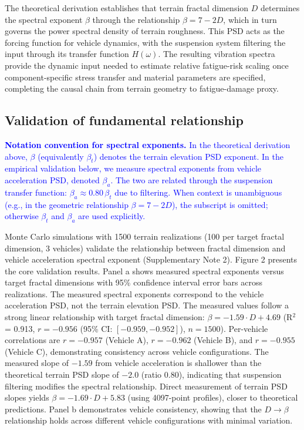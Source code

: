 \documentclass[11pt]{article}
\begin{document}
The theoretical derivation establishes that terrain fractal dimension $D$ determines the spectral exponent $\beta$ through the relationship $\beta = 7-2D$, which in turn governs the power spectral density of terrain roughness. This PSD acts as the forcing function for vehicle dynamics, with the suspension system filtering the input through its transfer function $H(\omega)$. The resulting vibration spectra provide the dynamic input needed to estimate relative fatigue-risk scaling once component-specific stress transfer and material parameters are specified, completing the causal chain from terrain geometry to fatigue-damage proxy.


\subsection*{Validation of fundamental relationship}

\textcolor{blue}{\textbf{Notation convention for spectral exponents.} In the theoretical derivation above, $\beta$ (equivalently $\beta_t$) denotes the terrain elevation PSD exponent. In the empirical validation below, we measure spectral exponents from vehicle acceleration PSD, denoted $\beta_a$. The two are related through the suspension transfer function: $\beta_a \approx 0.80 \, \beta_t$ due to filtering. When context is unambiguous (e.g., in the geometric relationship $\beta = 7-2D$), the subscript is omitted; otherwise $\beta_t$ and $\beta_a$ are used explicitly.}

Monte Carlo simulations with 1500 terrain realizations (100 per target fractal dimension, 3 vehicles) validate the relationship between fractal dimension and vehicle acceleration spectral exponent (Supplementary Note 2). Figure 2 presents the core validation results. Panel a shows measured spectral exponents versus target fractal dimensions with 95\% confidence interval error bars across realizations. The measured spectral exponents correspond to the vehicle acceleration PSD, not the terrain elevation PSD. The measured values follow a strong linear relationship with target fractal dimension: $\beta = -1.59 \cdot D + 4.69$ (R$^2$ = 0.913, $r = -0.956$ (95\% CI: $[-0.959, -0.952]$), $n=1500$). Per-vehicle correlations are $r = -0.957$ (Vehicle A), $r = -0.962$ (Vehicle B), and $r = -0.955$ (Vehicle C), demonstrating consistency across vehicle configurations. The measured slope of $-1.59$ from vehicle acceleration is shallower than the theoretical terrain PSD slope of $-2.0$ (ratio 0.80), indicating that suspension filtering modifies the spectral relationship. Direct measurement of terrain PSD slopes yields $\beta = -1.69 \cdot D + 5.83$ (using 4097-point profiles), closer to theoretical predictions. Panel b demonstrates vehicle consistency, showing that the $D \rightarrow \beta$ relationship holds across different vehicle configurations with minimal variation.
\end{document}

